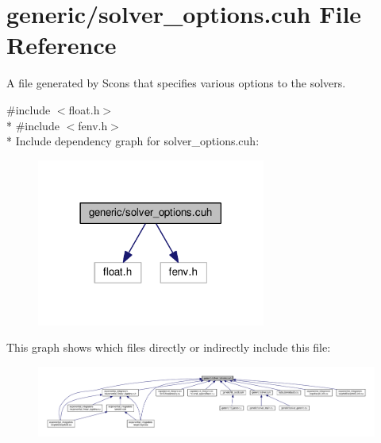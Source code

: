 \hypertarget{solver__options_8cuh}{}\section{generic/solver\+\_\+options.cuh File Reference}
\label{solver__options_8cuh}


A file generated by Scons that specifies various options to the solvers.  


{\ttfamily \#include $<$float.\+h$>$}\\*
{\ttfamily \#include $<$fenv.\+h$>$}\\*
Include dependency graph for solver\+\_\+options.\+cuh\+:\nopagebreak
\begin{figure}[H]
\begin{center}
\leavevmode
\includegraphics[width=213pt]{solver__options_8cuh__incl}
\end{center}
\end{figure}
This graph shows which files directly or indirectly include this file\+:\nopagebreak
\begin{figure}[H]
\begin{center}
\leavevmode
\includegraphics[width=350pt]{solver__options_8cuh__dep__incl}
\end{center}
\end{figure}
